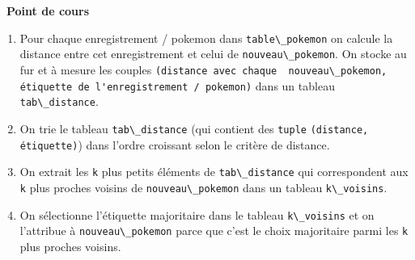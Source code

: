 \documentclass[
  11pt,
]{article}
\newcommand{\passthrough}[1]{#1}
\providecommand{\tightlist}{%
  \setlength{\itemsep}{0pt}\setlength{\parskip}{0pt}}
\newcounter{def}
\newcounter{cours}
\newenvironment{cours}[1]
{\par \medskip   \addtocounter{cours}{1} \noindent  
\begin{bclogo}[arrondi =0.1,  ombre = true, barre=none, logo=\bcbook, marge=4]{~\textbf{Point de cours} \textbf{\thecours} {\itshape #1} }  \par}
{
\end{bclogo}
 \par \bigskip }
\begin{document}
\begin{cours}{}
\begin{enumerate}
\def\labelenumi{\arabic{enumi}.}
\tightlist
\item
  Pour chaque enregistrement / pokemon dans
  \passthrough{\lstinline!table\_pokemon!} on calcule la distance entre
  cet enregistrement et celui de
  \passthrough{\lstinline!nouveau\_pokemon!}. On stocke au fur et à
  mesure les couples
  \passthrough{\lstinline!(distance avec chaque  nouveau\_pokemon, étiquette de l'enregistrement / pokemon)!}
  dans un tableau \passthrough{\lstinline!tab\_distance!}.
\item
  On trie le tableau \passthrough{\lstinline!tab\_distance!} (qui
  contient des \passthrough{\lstinline!tuple!}
  \passthrough{\lstinline!(distance, étiquette)!}) dans l'ordre
  croissant selon le critère de distance.
\item
  On extrait les \passthrough{\lstinline!k!} plus petits éléments de
  \passthrough{\lstinline!tab\_distance!} qui correspondent aux
  \passthrough{\lstinline!k!} plus proches voisins de
  \passthrough{\lstinline!nouveau\_pokemon!} dans un tableau
  \passthrough{\lstinline!k\_voisins!}.
\item
  On sélectionne l'étiquette majoritaire dans le tableau
  \passthrough{\lstinline!k\_voisins!} et on l'attribue à
  \passthrough{\lstinline!nouveau\_pokemon!} parce que c'est le choix
  majoritaire parmi les \passthrough{\lstinline!k!} plus proches
  voisins.
\end{enumerate}

\end{cours}
\end{document}
